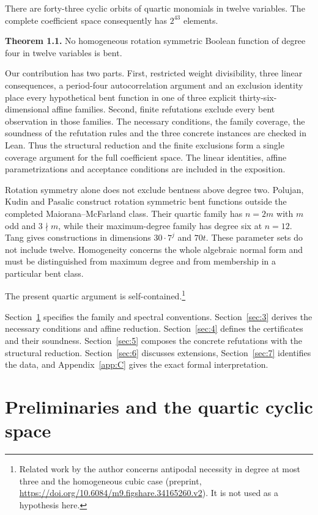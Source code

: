 \documentclass[pdflatex,sn-mathphys-num]{sn-jnl}
\begin{document}
There are forty-three cyclic orbits of quartic monomials in twelve variables. The complete coefficient space consequently has $2^{43}$ elements.

\textbf{Theorem 1.1.} No homogeneous rotation symmetric Boolean function of degree four in twelve variables is bent.

Our contribution has two parts. First, restricted weight divisibility, three linear consequences, a period-four autocorrelation argument and an exclusion identity place every hypothetical bent function in one of three explicit thirty-six-dimensional affine families. Second, finite refutations exclude every bent observation in those families. The necessary conditions, the family coverage, the soundness of the refutation rules and the three concrete instances are checked in Lean. Thus the structural reduction and the finite exclusions form a single coverage argument for the full coefficient space. The linear identities, affine parametrizations and acceptance conditions are included in the exposition.

Rotation symmetry alone does not exclude bentness above degree two. Polujan, Kudin and Pasalic \cite{ref9} construct rotation symmetric bent functions outside the completed Maiorana--McFarland class. Their quartic family has $n=2m$ with $m$ odd and $3\nmid m$, while their maximum-degree family has degree six at $n=12$. Tang \cite{ref10} gives constructions in dimensions $30\cdot7^j$ and $70t$. These parameter sets do not include twelve. Homogeneity concerns the whole algebraic normal form and must be distinguished from maximum degree and from membership in a particular bent class.

The present quartic argument is self-contained.\footnote{Related work by the author concerns antipodal necessity in degree at most three and the homogeneous cubic case (preprint, \url{https://doi.org/10.6084/m9.figshare.34165260.v2}). It is not used as a hypothesis here.}


Section~\ref{sec:2} specifies the family and spectral conventions. Section~\ref{sec:3} derives the necessary conditions and affine reduction. Section~\ref{sec:4} defines the certificates and their soundness. Section~\ref{sec:5} composes the concrete refutations with the structural reduction. Section~\ref{sec:6} discusses extensions, Section~\ref{sec:7} identifies the data, and Appendix~\ref{app:C} gives the exact formal interpretation.

\section{Preliminaries and the quartic cyclic space}\label{sec:2}
\end{document}
